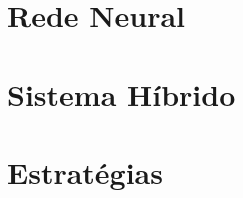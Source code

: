 \clearpage{}
\small \singlespacing{}
\begin{appendices}

\section{Rede Neural}



\clearpage{}

\section{Sistema Híbrido}



\clearpage{}

\section{Estratégias}



\end{appendices}
